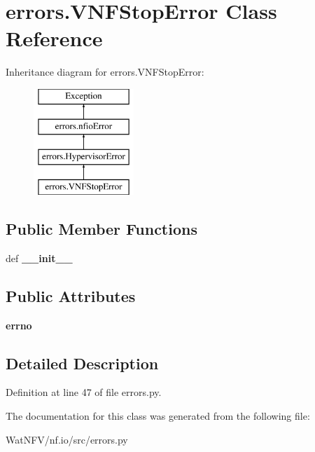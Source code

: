 \hypertarget{classerrors_1_1VNFStopError}{\section{errors.\-V\-N\-F\-Stop\-Error Class Reference}
\label{classerrors_1_1VNFStopError}
}
Inheritance diagram for errors.\-V\-N\-F\-Stop\-Error\-:\begin{figure}[H]
\begin{center}
\leavevmode
\includegraphics[height=4.000000cm]{classerrors_1_1VNFStopError}
\end{center}
\end{figure}
\subsection*{Public Member Functions}
\begin{DoxyCompactItemize}
\item 
\hypertarget{classerrors_1_1VNFStopError_ae71739f032a7cf54847bdd2141003fec}{def {\bfseries \-\_\-\-\_\-init\-\_\-\-\_\-}}\label{classerrors_1_1VNFStopError_ae71739f032a7cf54847bdd2141003fec}

\end{DoxyCompactItemize}
\subsection*{Public Attributes}
\begin{DoxyCompactItemize}
\item 
\hypertarget{classerrors_1_1VNFStopError_af1d4261289c681c59ebd21fedb30011e}{{\bfseries errno}}\label{classerrors_1_1VNFStopError_af1d4261289c681c59ebd21fedb30011e}

\end{DoxyCompactItemize}


\subsection{Detailed Description}


Definition at line 47 of file errors.\-py.



The documentation for this class was generated from the following file\-:\begin{DoxyCompactItemize}
\item 
Wat\-N\-F\-V/nf.\-io/src/errors.\-py\end{DoxyCompactItemize}
